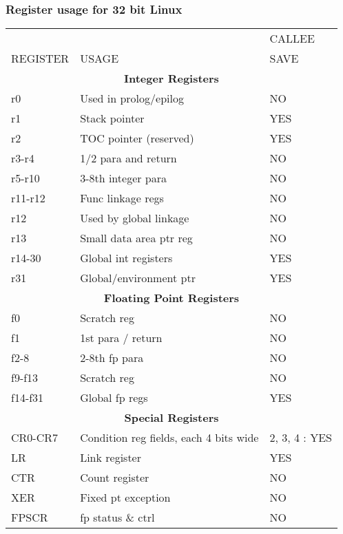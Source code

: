 \documentclass[11pt]{article}
\begin{document}
\subsubsection{Register usage for 32 bit Linux}
\begin{table}[hbt] 
\begin{center}
\begin{tabular}{||l|l|l||}\hline\hline
         &       & CALLEE\\
REGISTER & USAGE & SAVE\\\hline\hline
\multicolumn{3}{||c||}{\bf Integer Registers}\\\hline\hline
r0\footnotemark[1]
         & Used in prolog/epilog & NO \\\hline
r1       & Stack pointer         & YES \\\hline
r2       & TOC pointer (reserved)& YES \\\hline
r3-r4    & 1/2 para and return   & NO  \\\hline
r5-r10   & 3-8th  integer para   & NO  \\\hline
r11-r12  & Func linkage regs     & NO  \\\hline
r12      & Used by global linkage& NO  \\\hline
r13      & Small data area ptr reg& NO \\\hline
r14-30   & Global int registers  & YES  \\\hline
r31      & Global/environment ptr & YES \\\hline\hline
\multicolumn{3}{||c||}{\bf Floating Point Registers}\\\hline\hline
f0       & Scratch reg           & NO \\\hline
f1       & 1st para / return     & NO \\\hline
f2-8     & 2-8th fp para         & NO \\\hline
f9-f13   & Scratch reg           & NO \\\hline
f14-f31  & Global fp regs        & YES \\\hline\hline
\multicolumn{3}{||c||}{\bf Special Registers}\\\hline\hline
CR0-CR7  & Condition reg fields, each 4 bits wide & 2, 3, 4 : YES\\\hline
LR       & Link register         & YES \\\hline
CTR      & Count register        & NO  \\\hline
XER      & Fixed pt exception    & NO  \\\hline
FPSCR    & fp status \& ctrl     & NO  \\\hline\hline
\end{tabular}
\end{center}
\end{table}
\end{document}

